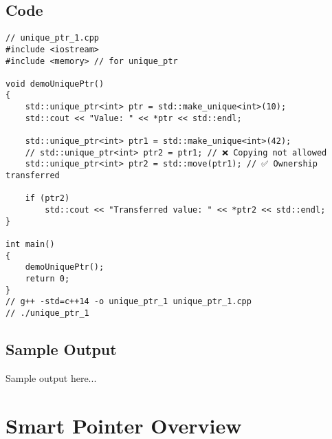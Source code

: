 \documentclass[12pt]{article}
\begin{document}
\subsection*{Code}
\begin{Verbatim}[fontsize=\small,frame=single]
// unique_ptr_1.cpp
#include <iostream>
#include <memory> // for unique_ptr

void demoUniquePtr()
{
    std::unique_ptr<int> ptr = std::make_unique<int>(10);
    std::cout << "Value: " << *ptr << std::endl;

    std::unique_ptr<int> ptr1 = std::make_unique<int>(42);
    // std::unique_ptr<int> ptr2 = ptr1; // ❌ Copying not allowed
    std::unique_ptr<int> ptr2 = std::move(ptr1); // ✅ Ownership transferred

    if (ptr2)
        std::cout << "Transferred value: " << *ptr2 << std::endl;
}

int main()
{
    demoUniquePtr();
    return 0;
}
// g++ -std=c++14 -o unique_ptr_1 unique_ptr_1.cpp
// ./unique_ptr_1
\end{Verbatim}

\subsection*{Sample Output}
\begin{tcolorbox}[colback=black!5!white,colframe=black!75!white]
Sample output here...
\end{tcolorbox}
\newpage

\section*{Smart Pointer Overview}
\end{document}
